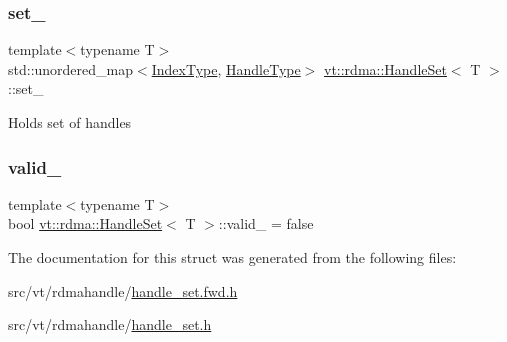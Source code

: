 \subsubsection{\texorpdfstring{set\+\_\+}{set\_}}
{\footnotesize\ttfamily template$<$typename T$>$ \\
std\+::unordered\+\_\+map$<$\hyperlink{structvt_1_1rdma_1_1_handle_set_aa0dbb6a47c459fb4290f0ca96e573097}{Index\+Type}, \hyperlink{structvt_1_1rdma_1_1_handle_set_ab3a698ee86bae503dfa84617205b2dd9}{Handle\+Type}$>$ \hyperlink{structvt_1_1rdma_1_1_handle_set}{vt\+::rdma\+::\+Handle\+Set}$<$ T $>$\+::set\+\_\+\hspace{0.3cm}{\ttfamily [private]}}

Holds set of handles \mbox{\label{structvt_1_1rdma_1_1_handle_set_a60d4c2fb59c226743eb8d9cb79d00e7a}} 
\subsubsection{\texorpdfstring{valid\+\_\+}{valid\_}}
{\footnotesize\ttfamily template$<$typename T$>$ \\
bool \hyperlink{structvt_1_1rdma_1_1_handle_set}{vt\+::rdma\+::\+Handle\+Set}$<$ T $>$\+::valid\+\_\+ = false\hspace{0.3cm}{\ttfamily [private]}}



The documentation for this struct was generated from the following files\+:\begin{DoxyCompactItemize}
\item 
src/vt/rdmahandle/\hyperlink{handle__set_8fwd_8h}{handle\+\_\+set.\+fwd.\+h}\item 
src/vt/rdmahandle/\hyperlink{handle__set_8h}{handle\+\_\+set.\+h}\end{DoxyCompactItemize}

